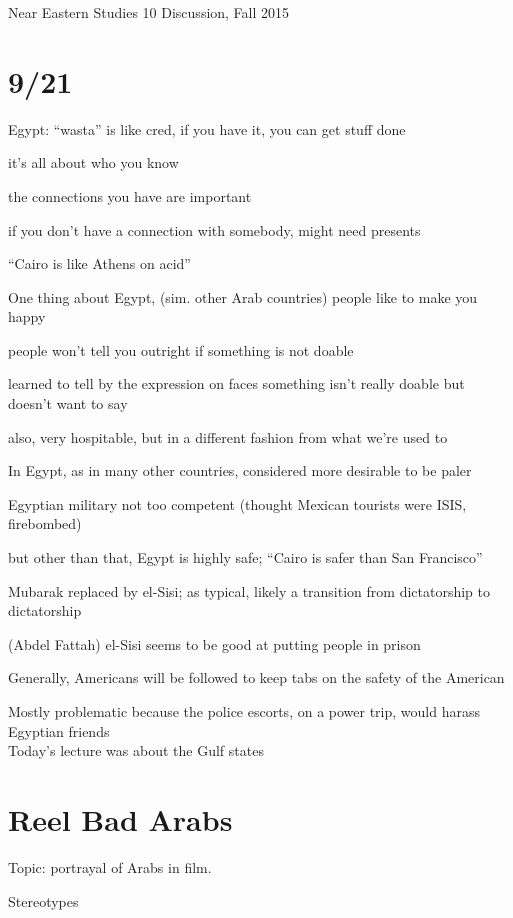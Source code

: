 \documentclass[12pt]{article}
\begin{document}
\noindent
Near Eastern Studies 10 Discussion, Fall 2015

\section{9/21}

Egypt: ``wasta'' is like cred, if you have it, you can get stuff done

it's all about who you know

the connections you have are important

if you don't have a connection with somebody, might need presents

``Cairo is like Athens on acid''

\noindent
One thing about Egypt, (sim. other Arab countries) people like to make you happy

people won't tell you outright if something is not doable

learned to tell by the expression on faces something isn't really doable but doesn't want to say

also, very hospitable, but in a different fashion from what we're used to

\noindent
In Egypt, as in many other countries, considered more desirable to be paler

\noindent
Egyptian military not too competent (thought Mexican tourists were ISIS, firebombed)

but other than that, Egypt is highly safe; ``Cairo is safer than San Francisco''

\noindent
Mubarak replaced by el-Sisi; as typical, likely a transition from dictatorship to dictatorship

(Abdel Fattah) el-Sisi seems to be good at putting people in prison

\noindent
Generally, Americans will be followed to keep tabs on the safety of the American

Mostly problematic because the police escorts, on a power trip, would harass Egyptian friends\\

\noindent
Today's lecture was about the Gulf states

\section{Reel Bad Arabs}

Topic: portrayal of Arabs in film.

\noindent
Stereotypes
\end{document}
